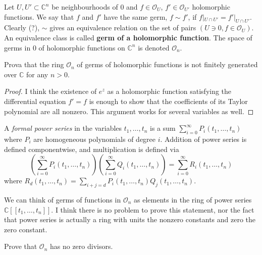 \begin{definition}
\label{definition-germ-holom-funct}
Let $U,U' \subset \mathbb{C}^n$ be
neighbourhoods of $0$ and $f \in
\mathcal{O}_U$, $f'\in\mathcal{O}_{U'}$
holomorphic functions. We say that $f$
and $f'$ have the same germ, $f\sim f'$, if
$f|_{U\cap U'}=f'|_{U\cap U'}$.
Clearly (?), $\sim$ gives an equivalence
relation on the set of pairs $(U\ni 0,
f\in \mathcal{O}_U)$. An equivalence class is
called {\bf germ of a holomorphic
function}. The space of germs in $0$ of
holomorphic functions on $\mathbb{C}^n$
is denoted $\mathcal{O}_n$.
\end{definition}

\begin{exercise}
\label{exercise-stalk-not-finit-gener-over}
Prova that the ring $\mathcal{O}_n$ of germs
of holomorphic functions is not
finitely generated over $\mathbb{C}$ for any
$n>0$.
\end{exercise}

\begin{proof}
I think the existence of $e^z$ as a
holomorphic function satisfying the
differential equation $f'=f$ is enough to
show that the coefficients of its
Taylor polynomial are all nonzero. This
argument works for several variables as
well.
\end{proof}

\begin{definition}
\label{definition-formal-power-series}
A {\it formal power series} in the variables
$t_1,\ldots,t_n$ is a sum
$\sum_{i=0}^{\infty}P_i(t_1,\ldots,t_n)$
where $P_i$ are homogeneous polynomials
of degree $i$. Addition of power series is
defined componentwise, and
multiplication is defined via
$$
\left(\sum_{i=0}^\infty
P_i(t_1,\ldots,t_n)\right)
\left(\sum_{i=0}^\infty
Q_i(t_1,\ldots,t_n)\right)
=\sum_{i=0}^\infty R_i(t_1,\ldots,t_n)
$$
where
$R_d(t_1,\ldots,t_n)=\sum_{i+j=d}P_i(t_1,
\ldots,t_n)Q_j(t_1,\ldots,t_n)$.
\end{definition}

We can think of germs of functions in
$\mathcal{O}_n$ as elements in the ring of
power series
$\mathbb{C}[\![t_1,\ldots,t_n]\!]$. I think
there is no problem to
prove this statement, nor the fact that power
series is actually a ring with
units the nonzero constants and zero the zero
constant.

\begin{exercise}
\label{exercise-stalk-has-no-zero-divisors}
Prove that $\mathcal{O}_n$ has no zero
divisors.
\end{exercise}

